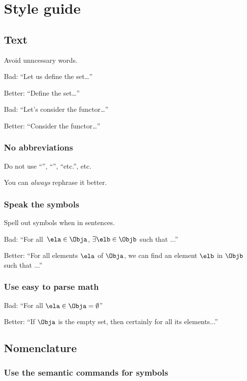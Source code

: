 

\section{Style guide}
\subsection*{Text}

Avoid unncessary words.

Bad: ``Let us define the set\dots''

Better: ``Define the set\dots''

Bad: ``Let's consider the functor\dots''

Better: ``Consider the functor\dots ''


\subsubsection*{No abbreviations}
Do not use ``\ie '', ``\eg '', ``etc.'', etc.

You can \emph{always} rephrase it better.

\subsubsection*{Speak the symbols}
Spell out symbols when in sentences.

Bad: ``For all~$\ela \in \Obja$, $\exists \elb \in \Objb$ such that ...''

Better: ``For all elements $\ela$ of $\Obja$, we can find an element $\elb$ in $\Objb$ such that ...''

\subsubsection*{Use easy to parse math}

Bad: ``For all $\ela\in \Obja=\emptyset$''

Better: ``If $\Obja$ is the empty set, then certainly for all its elements...''

\subsection*{Nomenclature}

\subsubsection*{Use the semantic commands for symbols}

